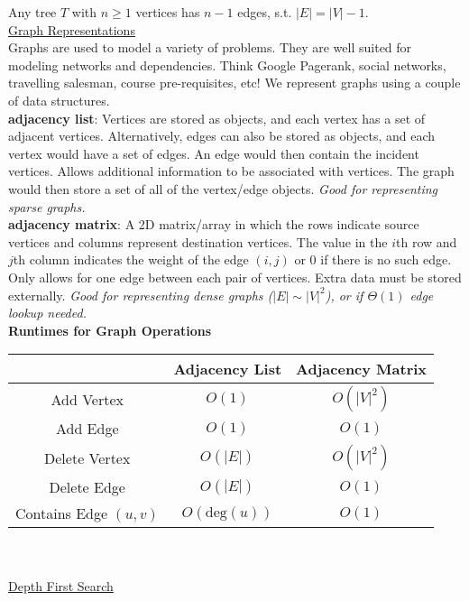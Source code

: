 \documentclass[12pt, fleqn]{general}
\begin{document}
\begin{multicols*}{2}
    Any tree $T$ with $n \geq 1$ vertices has $n - 1$ edges, s.t. $|E| = |V| - 1$.\\

    \underline{Graph Representations}\\

    Graphs are used to model a variety of problems. They are well suited for modeling networks and dependencies. Think Google Pagerank, social networks, travelling salesman, course pre-requisites, etc! We represent graphs using a couple of data structures.\\

    \textbf{adjacency list}: Vertices are stored as objects, and each vertex has a set of adjacent vertices. Alternatively, edges can also be stored as objects, and each vertex would have a set of edges. An edge would then contain the incident vertices. Allows additional information to be associated with vertices. The graph would then store a set of all of the vertex/edge objects. \emph{Good for representing sparse graphs.} \\

    \textbf{adjacency matrix}: A 2D matrix/array in which the rows indicate source vertices and columns represent destination vertices. The value in the $i$th row and $j$th column indicates the weight of the edge $(i, j)$ or $0$ if there is no such edge. Only allows for one edge between each pair of vertices. Extra data must be stored externally. \emph{Good for representing dense graphs ($|E| \sim |V|^2$), or if $\Theta(1)$ edge lookup needed.}\\

    \textbf{Runtimes for Graph Operations}\\

    {\scriptsize \begin{tabular}{|c|c|c|}\hline
    &\textbf{Adjacency List}&\textbf{Adjacency Matrix}\\\hline
    Add Vertex&$O(1)$&$O(|V|^2)$\\\hline
    Add Edge&$O(1)$&$O(1)$\\\hline
    Delete Vertex&$O(|E|)$&$O(|V|^2)$\\\hline
    Delete Edge&$O(|E|)$&$O(1)$\\\hline
    Contains Edge $(u,v)$&$O(\text{deg}(u))$&$O(1)$\\\hline
    \end{tabular}}\\\\

    {\large \underline{Depth First Search}}\\


\end{multicols*}
\end{document}
